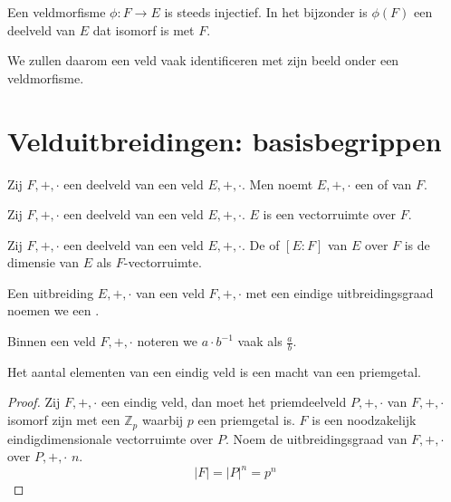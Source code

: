 \documentclass[main.tex]{subfiles}
\begin{document}
\begin{st}
  \label{st:veldmorfisme-is-injectief}
  Een veldmorfisme $\phi: F \rightarrow E$ is steeds injectief.
  In het bijzonder is $\phi(F)$ een deelveld van $E$ dat isomorf is met $F$.
\end{st}

\begin{opm}
  \label{opm:veldmorfisme-is-injectief}
  We zullen daarom een veld vaak identificeren met zijn beeld onder een veldmorfisme.
\end{opm}

\section{Velduitbreidingen: basisbegrippen}
\label{sec:veld-basisb}

\begin{de}
  Zij $F,+,\cdot$ een deelveld van een veld $E,+,\cdot$.
  Men noemt $E,+,\cdot$ een  of  van $F$.
\end{de}

\begin{st}
  Zij $F,+,\cdot$ een deelveld van een veld $E,+,\cdot$.
  $E$ is een vectorruimte over $F$.
  
\end{st}

\begin{de}
  \label{de:uitbreidingsgraad}
  Zij $F,+,\cdot$ een deelveld van een veld $E,+,\cdot$.
  De  of  $[E:F]$ van $E$ over $F$ is de dimensie van $E$ als $F$-vectorruimte.
\end{de}

\begin{de}
  Een uitbreiding $E,+,\cdot$ van een veld $F,+,\cdot$ met een eindige uitbreidingsgraad noemen we een .
\end{de}

\begin{de}
  Binnen een veld $F,+,\cdot$ noteren we $a\cdot b^{-1}$ vaak als $\frac{a}{b}$.
\end{de}

\begin{st}
\examen
  \label{st:eindig-veld-orde-macht-van-priemgetal}
  Het aantal elementen van een eindig veld is een macht van een priemgetal.

  \begin{proof}
    Zij $F,+,\cdot$ een eindig veld, dan moet het priemdeelveld $P,+,\cdot$ van $F,+,\cdot$ isomorf zijn met een $\mathbb{Z}_{p}$ waarbij $p$ een priemgetal is.
    $F$ is een noodzakelijk eindigdimensionale vectorruimte over $P$.
    Noem de uitbreidingsgraad van $F,+,\cdot$ over $P,+,\cdot$ $n$.
    \[ |F| = |P|^{n} = p^{n} \]
  \end{proof}
\end{st}
\end{document}
